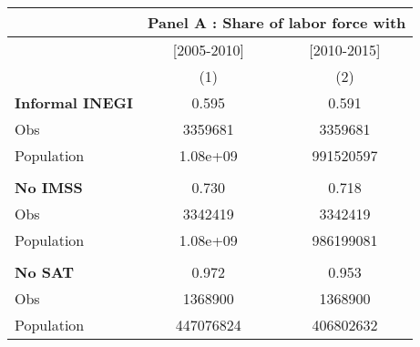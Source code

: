 \begin{tabular}{lcc}
\toprule
      & \multicolumn{2}{c}{Panel A : Share of labor force with} \\
\midrule
      & [2005-2010] & [2010-2015] \\
\midrule
      & (1)   & (2) \\
\midrule
\midrule
\textbf{Informal INEGI} & 0.595 & 0.591 \\
Obs   & 3359681 & 3359681 \\
Population & 1.08e+09 & 991520597 \\
      &       &  \\
\textbf{No IMSS} & 0.730 & 0.718 \\
Obs   & 3342419 & 3342419 \\
Population & 1.08e+09 & 986199081 \\
      &       &  \\
\textbf{No SAT} & 0.972 & 0.953 \\
Obs   & 1368900 & 1368900 \\
Population & 447076824 & 406802632 \\
\bottomrule
\bottomrule
\end{tabular}%
